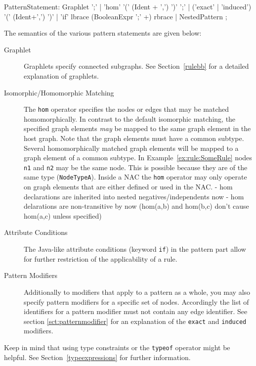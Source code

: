 \begin{rail}  
  PatternStatement: 
    Graphlet ';' |
    'hom' '(' (Ident + ',') ')' ';' |
    ('exact' | 'induced') '(' (Ident+',') ')' |
    'if' lbrace (BooleanExpr ';' +) rbrace |
    NestedPattern
    ;

\end{rail}
The semantics of the various pattern statements are given below:
\begin{description}
  \item[Graphlet] Graphlets specify connected subgraphs. See Section~\ref{rulebb} for a detailed explanation of graphlets.
  \item[Isomorphic/Homomorphic Matching] The \texttt{hom} operator specifies the nodes or edges that may be matched homomorphically. 
  In contrast to the default isomorphic matching, the specified graph elements \emph{may} be mapped to the same graph element in the host graph. Note that the graph elements must have a common subtype. 
  Several homomorphically matched graph elements will be mapped to a graph element of a common subtype.
  In Example~\ref{ex:rule:SomeRule} nodes \texttt{n1} and \texttt{n2} may be the same node. This is possible because they are of the same type (\texttt{NodeTypeA}).
  Inside a NAC the \texttt{hom} operator may only operate on graph elements that are either defined or used in the NAC.
 - hom declarations are inherited into nested negatives/independents now
 - hom delarations are non-transitive by now (hom(a,b) and hom(b,c) don't cause hom(a,c) unless specified)
   \item[Attribute Conditions] The Java-like attribute conditions (keyword \texttt{if}) in the pattern part allow for further restriction of the applicability of a rule.
  \item[Pattern Modifiers] Additionally to modifiers that apply to a pattern as a whole, you may also specify pattern modifiers for a specific set of nodes. Accordingly the list of identifiers for a pattern modifier must not contain any edge identifier. See section \ref{sct:patternmodifier} for an explanation of the \texttt{exact} and \texttt{induced} modifiers. 
\end{description}

Keep in mind that using type constraints or the \texttt{typeof} operator might be helpful. See Section~\ref{typeexpressions} for further information.


